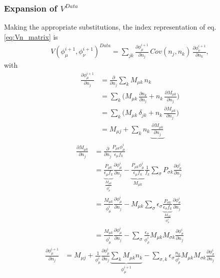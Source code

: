 \subsubsection{Expansion of $V^{Data}$} \label{ExpVn}
Making the appropriate substitutions, the index representation of eq. \ref{eq:Vn_matrix} is
\begin{align*}
	V(\phi^{i+1}_{\mu},\phi^{i+1}_{\nu})^{Data} = 
	\sum_{jk}
	\frac{\partial \phi^{i+1}_{\mu}}{\partial n_{j}} \,
	Cov(n_{j},n_{k}) \,
	\frac{\partial \phi^{i+1}_{\nu}}{\partial n_{k}},
\end{align*}
with
\begin{align*}
	\frac{\partial \phi^{i+1}_{\mu}}{\partial n_{j}} &= \frac{\partial}{\partial n_{j}} \sum_{k}{M_{\mu k} \, n_{k}} \\
	&= \sum_{k} \bigl ( {M_{\mu k} \, \frac{\partial n_{k}}{\partial n_{j}} + n_{k}  \, \frac{\partial M_{\mu k}}{\partial n_{j}}} \bigr) \\
	&= \sum_{k} \bigl ( {M_{\mu k} \, \delta_{jk} + n_{k}  \, \frac{\partial M_{\mu k}}{\partial n_{j}}} \bigr) \\
	&= M_{\mu j} + \sum_{k}{n_{k}  \, \underbrace{\frac{\partial M_{\mu k}}{\partial n_{j}}}}
\end{align*}
%
\begin{align*}
	\frac{\partial M_{\mu k}}{\partial n_{j}} &= \frac{\partial}{\partial n_{j}} \frac{P_{\mu k} \phi^{i}_{\mu} }{ \epsilon_{\mu} f_{k} } \\
	&= \underbrace{ \frac{P_{\mu k}}{\epsilon_{\mu} f_{k}} }_{\frac{M_{\mu k}}{\phi^{i}_{\mu}}} \frac{\partial \phi^{i}_{\mu}}{\partial n_{j}}
	- \underbrace{ \frac{P_{\mu k} \phi^{i}_{\mu}}{\epsilon_{\mu} f_{k}} }_{M_{\mu k}}
	\frac{1}{f_{k}}\sum_{\sigma}{P_{\sigma k} \frac{\partial \phi^{i}_{\sigma}}{\partial n_{j}} } \\
	&= \frac{M_{\mu k}}{\phi^{i}_{\mu}} \frac{\partial \phi^{i}_{\mu}}{\partial n_{j}} - M_{\mu k}
	\sum_{\sigma}{ \epsilon_{\sigma} \underbrace{ \frac{ P_{\sigma k} }{  \epsilon_{\sigma} f_{k} } }_{\frac{M_{\sigma k}}{\phi^{i}_{\sigma}}}
	\frac{\partial \phi^{i}_{\sigma}}{\partial n_{j}}} \\
	&= \frac{M_{\mu k}}{\phi^{i}_{\mu}} \frac{\partial \phi^{i}_{\mu}}{\partial n_{j}} - \sum_{\sigma}{ \frac{\epsilon_{\sigma}}{\phi^{i}_{\rho}} M_{\mu k} M_{\sigma k} \frac{\partial \phi^{i}_{\sigma}}{\partial n_{j}}}
\end{align*}
%
\begin{align*}
	\frac{\partial \phi^{i+1}_{\mu}}{\partial n_{j}}
	&= M_{\mu j} + \frac{1}{\phi^{i}_{\mu}} \frac{\partial \phi^{i}_{\mu}}{\partial n_{j}} \underbrace{\sum_{k} {M_{\mu k} n_{k}}}_{\phi^{i+1}_{\mu}}
	- \sum_{\sigma, k}{ \epsilon_{\sigma} \frac{n_{k}}{\phi^{i}_{\rho}} M_{\mu k} M_{\sigma k} \frac{\partial \phi^{i}_{\sigma}}{\partial n_{j}}} \\
\end{align*}

